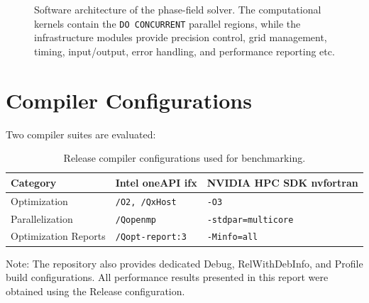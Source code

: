 \documentclass[11pt,a4paper]{article}
\begin{document}
\begin{figure}[ht]
	
	\caption{Software architecture of the phase-field solver. The computational kernels contain the \texttt{DO CONCURRENT} parallel regions, while the infrastructure modules provide precision control, grid management, timing, input/output, error handling, and performance reporting etc.}
	\label{fig:software_architecture}
	
\end{figure}

	\section{Compiler Configurations}
	
	Two compiler suites are evaluated:
	
	\begin{table}[H]
		\centering
		\caption{Release compiler configurations used for benchmarking.}
		\begin{tabular}{|l|p{4.5cm}|p{4.5cm}|}
			\hline
			\textbf{Category} & \textbf{Intel oneAPI ifx} & \textbf{NVIDIA HPC SDK nvfortran} \\
			\hline
			Optimization & \texttt{/O2, /QxHost} & \texttt{-O3} \\
			\hline
			Parallelization & \texttt{/Qopenmp} & \texttt{-stdpar=multicore} \\
			\hline
			Optimization Reports & \texttt{/Qopt-report:3} & \texttt{-Minfo=all} \\
			\hline
		\end{tabular}
		\label{tab:compiler_config}
	\end{table}
	
Note: The repository also provides dedicated Debug, RelWithDebInfo, and Profile build configurations. All performance results presented in this report were obtained using the Release configuration.	
	
\end{document}
